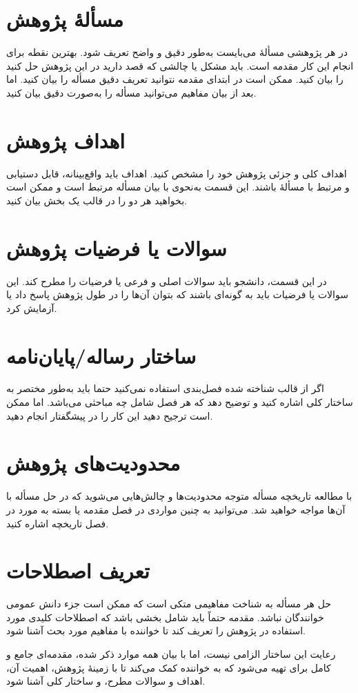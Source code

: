 \section{مسألهٔ پژوهش}
در هر پژوهشی مسألهٔ می‌بایست به‌طور دقیق و واضح تعریف شود. بهترین نقطه برای انجام این کار مقدمه است. باید مشکل یا چالشی که قصد دارید در این پژوهش حل کنید را بیان کنید. ممکن است در ابتدای مقدمه نتوانید تعریف دقیق مسأله را بیان کنید. اما بعد از بیان مفاهیم می‌توانید مسأله را به‌صورت دقیق بیان کنید.


\section{اهداف پژوهش}
اهداف کلی و جزئی پژوهش خود را مشخص کنید. اهداف باید واقع‌بینانه، قابل دستیابی و مرتبط با مسألهٔ باشند. این قسمت به‌نحوی با بیان مسأله مرتبط است و ممکن است بخواهید هر دو را در قالب یک بخش بیان کنید.


\section{سوالات یا فرضیات پژوهش}
در این قسمت، دانشجو باید سوالات اصلی و فرعی یا فرضیات را مطرح کند. این سوالات یا فرضیات باید به گونه‌ای باشند که بتوان آن‌ها را در طول پژوهش پاسخ داد یا آزمایش کرد.


\section{ساختار رساله/پایان‌نامه}
اگر از قالب شناخته شده فصل‌بندی استفاده نمی‌کنید حتما باید به‌طور مختصر به ساختار کلی 
\thesis 
اشاره کنید و توضیح دهد که هر فصل شامل چه مباحثی می‌باشد. اما ممکن است ترجیح دهید این کار را در پیشگفتار انجام دهید.


\section{محدودیت‌های پژوهش}
با مطالعه تاریخچه مسأله متوجه محدودیت‌ها و چالش‌هایی می‌شوید که در حل مسأله با آن‌ها مواجه خواهید شد. می‌توانید به چنین مواردی در فصل مقدمه یا بسته به مورد در فصل تاریخچه اشاره کنید.


\section{تعریف اصطلاحات}
حل هر مسأله به شناخت مفاهیمی متکی است که ممکن است جزء دانش عمومی خوانندگان نباشد. مقدمه حتماً باید شامل بخشی باشد که اصطلاحات کلیدی مورد استفاده در پژوهش را تعریف کند تا خواننده با مفاهیم مورد بحث آشنا شود.

رعایت این ساختار الزامی نیست، اما با بیان همه موارد ذکر شده، مقدمه‌ای جامع و کامل برای 
\thesis 
تهیه می‌شود که به خواننده کمک می‌کند تا با زمینهٔ پژوهش، اهمیت آن، اهداف و سوالات مطرح، و ساختار کلی 
\thesis
آشنا شود.

